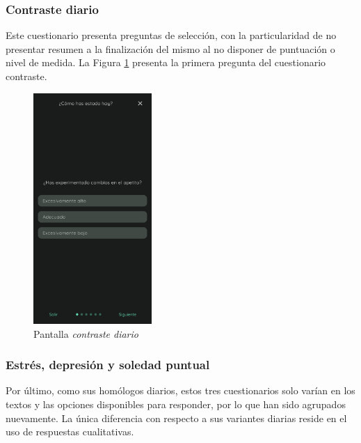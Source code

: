                 \clearpage  %
            \subsubsection*{Contraste diario}
                Este cuestionario presenta preguntas de selección, con la particularidad de no presentar resumen a la finalización del mismo al no disponer de puntuación o nivel de medida. La Figura \ref{figure:implementacion:pantalla:contraste_diario} presenta la primera pregunta del cuestionario contraste. 
                
                \begin{figure}[h]
                	\centering
                	\includegraphics[width=0.4\textwidth]{figures/pantallas/Contraste diario.png}
                	\caption{Pantalla \textit{contraste diario}}
                	\label{figure:implementacion:pantalla:contraste_diario}
                \end{figure}

                \clearpage  %
            \subsubsection*{Estrés, depresión y soledad puntual}
                Por último, como sus homólogos diarios, estos tres cuestionarios solo varían en los textos y las opciones disponibles para responder, por lo que han sido agrupados nuevamente. La única diferencia con respecto a sus variantes diarias reside en el uso de respuestas cualitativas.
                
